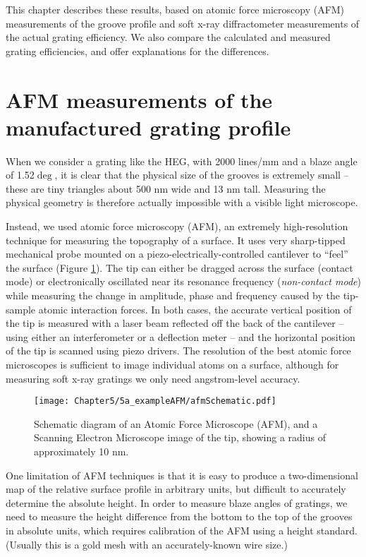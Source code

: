 This chapter describes these results, based on atomic force microscopy (AFM) measurements of the groove profile and soft x-ray diffractometer measurements of the actual grating efficiency.  We also compare the calculated and measured grating efficiencies, and offer explanations for the differences.

\section{AFM measurements of the manufactured grating profile}
When we consider a grating like the HEG, with 2000 lines/mm and a blaze angle of 1.52$\deg$, it is clear that the physical size of the grooves is extremely small -- these are tiny triangles about 500 nm wide and 13 nm tall.  Measuring the physical geometry is therefore actually impossible with a visible light microscope.

Instead, we used atomic force microscopy (AFM), an extremely high-resolution technique for measuring the topography of a surface.  It uses very sharp-tipped mechanical probe mounted on a piezo-electrically-controlled cantilever to ``feel'' the surface (Figure \ref{afm}).  The tip can either be dragged across the surface (contact mode) or electronically oscillated near its resonance frequency (\emph{non-contact mode}) while measuring the change in amplitude, phase and frequency caused by the tip-sample atomic interaction forces.  In both cases, the accurate vertical position of the tip is measured with a laser beam reflected off the back of the cantilever -- using either an interferometer or a deflection meter -- and the horizontal position of the tip is scanned using piezo drivers.  The resolution of the best atomic force microscopes is sufficient to image individual atoms on a surface, although for measuring soft x-ray gratings we only need angstrom-level accuracy.

\begin{figure}[htbp] %
   \centering
   \texttt{[image: Chapter5/5a\_exampleAFM/afmSchematic.pdf]} 
   \caption{Schematic diagram of an Atomic Force Microscope (AFM), and a Scanning Electron Microscope image of the tip, showing a radius of approximately 10 nm.}
   \label{afm}
\end{figure}

One limitation of AFM techniques is that it is easy to produce a two-dimensional map of the relative surface profile in arbitrary units, but difficult to accurately determine the absolute height.  In order to measure blaze angles of gratings, we need to measure the height difference from the bottom to the top of the grooves in absolute units, which requires calibration of the AFM using a height standard.  (Usually this is a gold mesh with an accurately-known wire size.)

